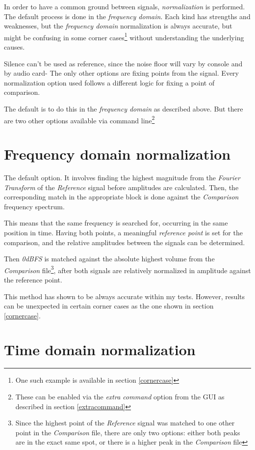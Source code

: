 \documentclass[10pt,a4paper]{report}
\begin{document}
\begin{appendices}
In order to have a common ground between signals, \textit{normalization} is performed. The default process is done in the \textit{frequency domain}. Each kind has strengths and weaknesses, but the \textit{frequency domain} normalization is always accurate, but might be confusing in some corner cases\footnote{One such example is available in section \ref{cornercase}} without understanding the underlying causes.

Silence can't be used as reference, since the noise floor will vary by console and by audio card- The only other options are fixing points from the signal. Every normalization option used follows a different logic for fixing a point of comparison. 

The default is to do this in the \textit{frequency domain} as described above. But there are two other options available via command line\footnote{These can be enabled via the \textit{extra command} option from the GUI as described in section \ref{extracommand}}

\section{Frequency domain normalization}

The default option. It involves finding the highest magnitude from the \textit{Fourier Transform} of the \textit{Reference} signal before amplitudes are calculated. Then, the corresponding match in the appropriate block is done against the \textit{Comparison} frequency spectrum. 

This means that the same frequency is searched for, occurring in the same position in time. Having both points, a meaningful \textit{reference point} is set for the comparison, and the relative amplitudes between the signals can be determined.

Then \textit{0dBFS} is matched against the absolute highest volume from the \textit{Comparison} file\footnote{Since the highest point of the \textit{Reference} signal was matched to one other point in the \textit{Comparison} file, there are only two options: either both peaks are in the exact same spot, or there is a higher peak in the \textit{Comparison} file}, after both signals are relatively normalized in amplitude against the reference point.

This method has shown to be always accurate within my tests. However, results can be unexpected in certain corner cases as the one shown in section \ref{cornercase}. 

\section{Time domain normalization}


\end{appendices}
\end{document}
